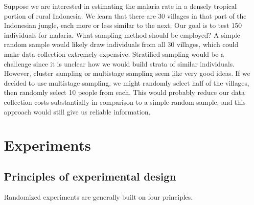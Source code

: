 \begin{examplewrap}
\begin{nexample}{Suppose we are interested in estimating
    the malaria rate in a densely tropical portion of rural
    Indonesia.
    We learn that there are 30 villages in that part of the
    Indonesian jungle, each more or less similar to the next.
    Our goal is to test 150 individuals for malaria.
    What sampling method should be employed?}
  A simple random sample would likely draw individuals from
  all 30 villages, which could make data collection extremely
  expensive.
  Stratified sampling would be a challenge since it is
  unclear how we would build strata of similar individuals.
  However, cluster sampling or multistage sampling seem like
  very good ideas.
  If we decided to use multistage sampling, we might randomly
  select half of the villages, then randomly select
  10 people from each.
  This would probably reduce our data collection costs
  substantially in comparison to a simple random sample,
  and this approach would still give us reliable information.
\end{nexample}
\end{examplewrap}


\section{Experiments}
\label{experimentsSection}



\subsection{Principles of experimental design}
\label{experimentalDesignPrinciples}

\noindent{}Randomized experiments are generally built on four principles.

